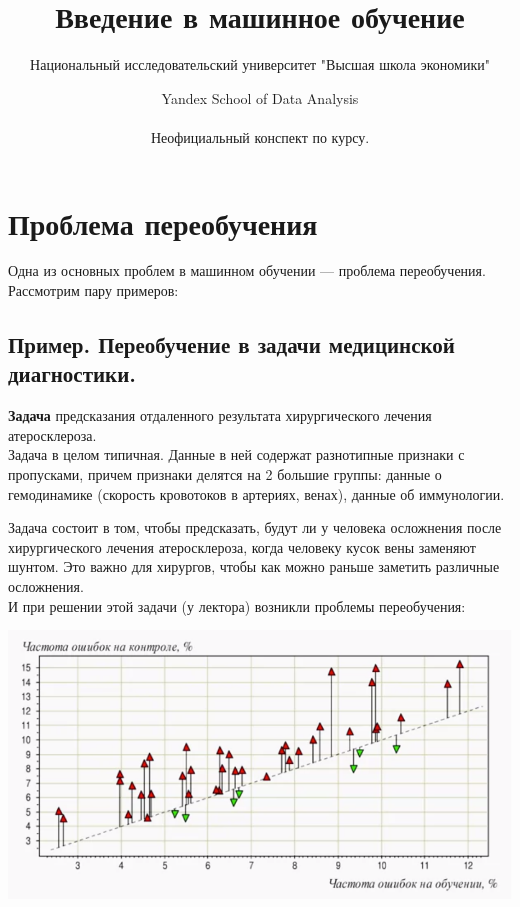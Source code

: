 \documentclass{article}
\title{Введение в машинное обучение}
\author{Национальный исследовательский университет "Высшая школа экономики" \and Yandex School of Data Analysis\\\\
Неофициальный конспект по курсу.}
\begin{document}
\maketitle
\tableofcontents
\newpage

\section{Проблема переобучения}

Одна из основных проблем в машинном обучении --- проблема переобучения. Рассмотрим пару примеров:

\subsection{Пример. Переобучение в задачи медицинской диагностики.}

\textbf{Задача} предсказания отдаленного результата хирургического лечения атеросклероза.
\\

Задача в целом типичная. Данные в ней содержат разнотипные признаки с пропусками, причем признаки делятся на 2 большие группы: данные о гемодинамике (скорость кровотоков в артериях, венах), данные об иммунологии. 

Задача состоит в том, чтобы предсказать, будут ли у человека осложнения после хирургического лечения атеросклероза, когда человеку кусок вены заменяют шунтом. Это важно для хирургов, чтобы как можно раньше заметить различные осложнения.
\\

И при решении этой задачи (у лектора) возникли проблемы переобучения:

\begin{center}
    \includegraphics[scale=0.6]{images/2_1.png}
\end{center}
\end{document}
